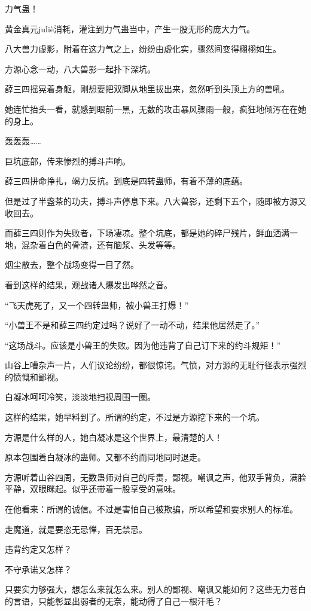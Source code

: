 \begin{this_body}
力气蛊！

黄金真元juliè消耗，灌注到力气蛊当中，产生一股无形的庞大力气。

八大兽力虚影，附着在这力气之上，纷纷由虚化实，骤然间变得栩栩如生。

方源心念一动，八大兽影一起扑下深坑。

薛三四摇晃着身躯，刚想要把双脚从地里拔出来，忽然听到头顶上方的兽吼。

她连忙抬头一看，就感到眼前一黑，无数的攻击暴风骤雨一般，疯狂地倾泻在在她的身上。

轰轰轰……

巨坑底部，传来惨烈的搏斗声响。

薛三四拼命挣扎，竭力反抗。到底是四转蛊师，有着不薄的底蕴。

但是过了半盏茶的功夫，搏斗声停息下来。八大兽影，还剩下五个，随即被方源又收回去。

而薛三四则作为失败者，下场凄凉。整个坑底，都是她的碎尸残片，鲜血洒满一地，混杂着白色的骨渣，还有脑浆、头发等等。

烟尘散去，整个战场变得一目了然。

看到这样的结果，观战诸人爆发出哗然之音。

“飞天虎死了，又一个四转蛊师，被小兽王打爆！”

“小兽王不是和薛三四约定过吗？说好了一动不动，结果他居然走了。”

“这场战斗。应该是小兽王的失败。因为他违背了自己订下来的约斗规矩！”

山谷上嘈杂声一片，人们议论纷纷，都很惊诧。气愤，对方源的无耻行径表示强烈的愤慨和鄙视。

白凝冰呵呵冷笑，淡淡地扫视周围一圈。

这样的结果，她早料到了。所谓的约定，不过是方源挖下来的一个坑。

方源是什么样的人，她白凝冰是这个世界上，最清楚的人！

原本包围着白凝冰的蛊师。又都不约而同地同时退走。

方源听着山谷四周，无数蛊师对自己的斥责，鄙视。嘲讽之声，他双手背负，满脸平静，双眼眯起。似乎还带着一股享受的意味。

在他看来：所谓的诚信。不过是害怕自己被欺骗，所以希望和要求别人的标准。

走魔道，就是要恣无忌惮，百无禁忌。

违背约定又怎样？

不守承诺又怎样？

只要实力够强大，想怎么来就怎么来。别人的鄙视、嘲讽又能如何？这些无力苍白的言语，只能彰显出弱者的无奈，能动得了自己一根汗毛？


\end{this_body}
